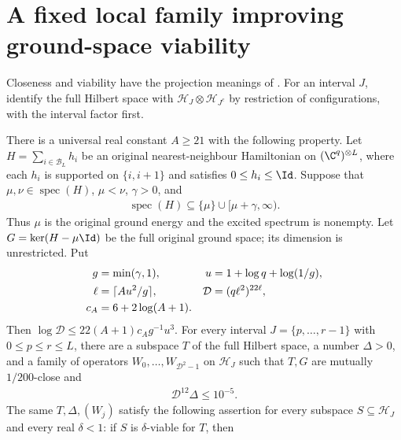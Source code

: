 \section{A fixed local family improving ground-space viability}

Closeness and viability have the projection meanings of
\cite[``Closeness and viability of subspaces'']{QICLean2026Blueprint}.
For an interval $J$, identify the full Hilbert space with
$\mathcal H_J\otimes\mathcal H_{J^c}$ by restriction of configurations,
with the interval factor first.

\begin{lemma}
    \label{thm:physical_dg_viable_family}
    \leanok
    There is a universal real constant $A\ge21$ with the following property.
    Let $H=\sum_{i\in\mathcal B_L}h_i$ be an original nearest-neighbour
    Hamiltonian on $(\C^q)^{\otimes L}$, where each $h_i$ is supported on
    $\{i,i+1\}$ and satisfies $0\le h_i\le\Id$.
    Suppose that $\mu,\nu\in\operatorname{spec}(H)$, $\mu<\nu$,
    $\gamma>0$, and
    \begin{align}
        \operatorname{spec}(H)\subseteq\{\mu\}\cup[\mu+\gamma,\infty).
    \end{align}
    Thus $\mu$ is the original ground energy and the excited spectrum is
    nonempty. Let $G=\ker(H-\mu\Id)$ be the full original ground space;
    its dimension is unrestricted. Put
    \begin{align}
        g    & =\min(\gamma,1),      & u          & =1+\log q+\log(1/g),\notag \\
        \ell & =\lceil Au^2/g\rceil, & \mathcal D & =(q\ell^2)^{22\ell},\notag \\
        c_A  & =6+2\log(A+1).
    \end{align}
    Then $\log\mathcal D\le22(A+1)c_Ag^{-1}u^3$.
    For every interval $J=\{p,\ldots,r-1\}$ with $0\le p\le r\le L$,
    there are a subspace $T$ of the full Hilbert space, a number $\Delta>0$,
    and a family of operators $W_0,\ldots,W_{\mathcal D^2-1}$ on
    $\mathcal H_J$ such that $T,G$ are mutually $1/200$-close and
    \begin{align}
        \mathcal D^{12}\Delta\le10^{-5}.
    \end{align}
    The same $T,\Delta,(W_j)$ satisfy the following assertion for every
    subspace $S\subseteq\mathcal H_J$ and every real $\delta<1$:
    if $S$ is $\delta$-viable for $T$, then

\end{lemma}
